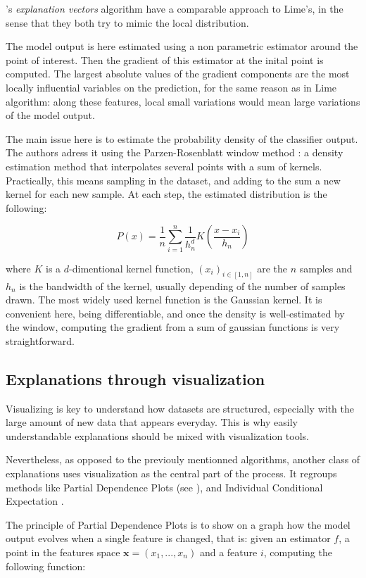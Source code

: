 \documentclass[a4paper,11pt]{kth-mag}
\begin{document}
\citeauthor{explvect}'s \textit{explanation vectors} algorithm \cite{explvect} have a comparable approach to Lime's, in the sense that they both try to mimic the local distribution.

The model output is here estimated using a non parametric estimator around the point of interest. Then the gradient of this estimator at the inital point is computed. The largest absolute values of the gradient components are the most locally influential variables on the prediction, for the same reason as in Lime algorithm: along these features, local small variations would mean large variations of the model output.

The main issue here is to estimate the probability density of the classifier output. The authors adress it using the Parzen-Rosenblatt window method \cite{parzen} \cite{rosenblatt}: a density estimation method that interpolates several points with a sum of kernels. Practically, this means sampling in the dataset, and adding to the sum a new kernel for each new sample. At each step, the estimated distribution is the following:

\[
	P(x) = \frac{1}{n} \sum_{i=1}^n \frac1{h_n^d} K \left( \frac{x - x_i}{h_n} \right)
\]

where $K$ is a $d$-dimentional kernel function, $(x_i)_{i \in [1,n]}$ are the $n$ samples and $h_n$ is the bandwidth of the kernel, usually depending of the number of samples drawn. The most widely used kernel function is the Gaussian kernel. It is convenient here, being differentiable, and once the density is well-estimated by the window, computing the gradient from a sum of gaussian functions is very straightforward.

\subsection{Explanations through visualization}

Visualizing is key to understand how datasets are structured, especially with the large amount of new data that appears everyday. This is why easily understandable explanations should be mixed with visualization tools.

Nevertheless, as opposed to the previouly mentionned algorithms, another class of explanations uses visualization as the central part of the process. It regroups methods like Partial Dependence Plots (see \cite{elementsofstats}), and Individual Conditional Expectation \cite{ice}.

The principle of Partial Dependence Plots is to show on a graph how the model output evolves when a single feature is changed, that is: given an estimator $f$, a point in the features space $\mathbf{x} = (x_1, ..., x_n)$ and a feature $i$, computing the following function:
\end{document}
